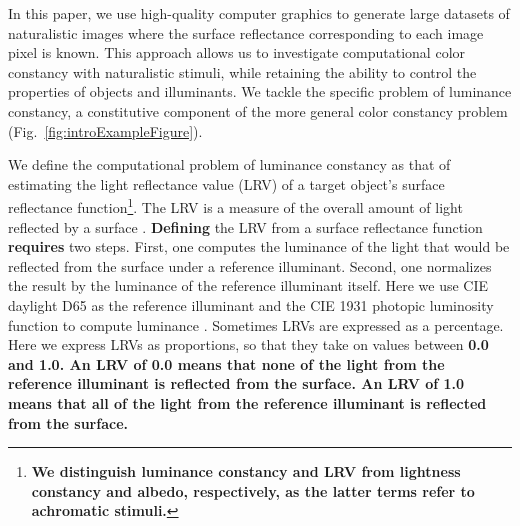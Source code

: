 \documentclass{jov}
\providecommand{\DIFaddtex}[1]{{\bf #1}} %
\providecommand{\DIFdeltex}[1]{} %
\providecommand{\DIFaddbegin}{} %
\providecommand{\DIFaddend}{} %
\providecommand{\DIFdelbegin}{} %
\providecommand{\DIFdelend}{} %
\providecommand{\DIFadd}[1]{\texorpdfstring{\DIFaddtex{#1}}{#1}} %
\providecommand{\DIFdel}[1]{\texorpdfstring{\DIFdeltex{#1}}{}} %
\newcommand{\DIFscaledelfig}{0.5}
\newlength{\DIFdelgraphicswidth} %
\newlength{\DIFdelgraphicsheight} %
\newcommand{\DIFaddincludegraphics}[2][]{{\color{blue}\fbox{\DIFOincludegraphics[#1]{#2}}}} %
\newcommand{\DIFdelincludegraphics}[2][]{%
\sbox{\DIFdelgraphicsbox}{\DIFOincludegraphics[#1]{#2}}%
\settoboxwidth{\DIFdelgraphicswidth}{\DIFdelgraphicsbox} %
\settoboxtotalheight{\DIFdelgraphicsheight}{\DIFdelgraphicsbox} %
\scalebox{\DIFscaledelfig}{%
\parbox[b]{\DIFdelgraphicswidth}{\usebox{\DIFdelgraphicsbox}\\[-\baselineskip] \rule{\DIFdelgraphicswidth}{0em}}\llap{\resizebox{\DIFdelgraphicswidth}{\DIFdelgraphicsheight}{%
\setlength{\unitlength}{\DIFdelgraphicswidth}%
\begin{picture}(1,1)%
\thicklines\linethickness{2pt} %
{\color[rgb]{1,0,0}\put(0,0){\framebox(1,1){}}}%
{\color[rgb]{1,0,0}\put(0,0){\line( 1,1){1}}}%
{\color[rgb]{1,0,0}\put(0,1){\line(1,-1){1}}}%
\end{picture}%
}\hspace*{3pt}}} %
} %
\DeclareRobustCommand{\DIFaddbegin}{\DIFOaddbegin \let\includegraphics\DIFaddincludegraphics} %
\DeclareRobustCommand{\DIFaddend}{\DIFOaddend \let\includegraphics\DIFOincludegraphics} %
\DeclareRobustCommand{\DIFdelbegin}{\DIFOdelbegin \let\includegraphics\DIFdelincludegraphics} %
\DeclareRobustCommand{\DIFdelend}{\DIFOaddend \let\includegraphics\DIFOincludegraphics} %
\begin{document}
In this paper, we use high-quality computer graphics to generate large datasets of naturalistic images where the surface reflectance corresponding to each image pixel is known. 
This approach allows us to investigate computational color constancy with naturalistic stimuli, while retaining the ability to control the properties of objects and illuminants. We tackle the specific problem of luminance constancy, a constitutive component of the more general color constancy problem (Fig.~\ref{fig:introExampleFigure}). 

We define the computational problem of luminance constancy as that of estimating the light reflectance value (LRV) of a target object's surface reflectance function\DIFaddbegin \footnote{\DIFadd{We distinguish luminance constancy and LRV from lightness constancy and albedo, respectively, as the latter terms refer to achromatic stimuli.}}\DIFaddend .
The LRV is a measure of the overall amount of light reflected by a surface \cite{astm1121477}.
\DIFdelbegin \DIFdel{Estimating }\DIFdelend \DIFaddbegin \DIFadd{Defining }\DIFaddend the LRV from a surface reflectance function \DIFdelbegin \DIFdel{proceeds in }\DIFdelend \DIFaddbegin \DIFadd{requires }\DIFaddend two steps.
First, one computes the luminance of the light that would be reflected from the surface under a reference illuminant.
Second, one normalizes the result by the luminance of the reference illuminant itself.
Here we use CIE daylight D65 as the reference illuminant and the CIE 1931 photopic luminosity function to compute luminance \cite{CIE86}.
Sometimes LRVs are expressed as a percentage.
Here we express LRVs as proportions, so that they take on values between \DIFdelbegin \DIFdel{0 and 1.
}\DIFdelend \DIFaddbegin \DIFadd{0.0 and 1.0. 
An LRV of 0.0 means that none of the light from the reference illuminant is reflected from the surface. 
An LRV of 1.0 means that all of the light from the reference illuminant is reflected from the surface.
}\DIFaddend 
\end{document}
